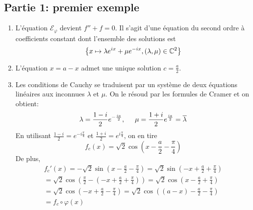 \subsection*{Partie 1: premier exemple}
\begin{enumerate}
  \item L'équation $\mathcal{E}_\varphi$ devient $f''+f=0$. Il s'agit d'une équation du second ordre à coefficients constant dont l'ensemble des solutions est
\begin{displaymath}
  \left\lbrace 
x\mapsto \lambda e^{ix} + \mu e^{-ix}, (\lambda,\mu)\in \mathbb{C}^2  
  \right\rbrace 
\end{displaymath}
\item L'équation $x = a-x$ admet une unique solution $c=\frac{a}{2}$.
\item Les conditions de Cauchy se traduisent par un système de deux équations linéaires aux inconnues $\lambda$ et $\mu$. On le résoud par les formules de Cramer et on obtient:
\begin{displaymath}
  \lambda = \frac{1-i}{2}e^{-\frac{ia}{2}}, \hspace{0.5cm}\mu = \frac{1+i}{2}e^{\frac{ia}{2}} = \overline{\lambda}
\end{displaymath}
En utilisant $\frac{1-i}{2}=e^{-i\frac{\pi}{4}}$ et $\frac{1+i}{2}=e^{i\frac{\pi}{4}}$, on en tire
\begin{displaymath}
  f_c(x) = \sqrt{2}\cos\left( x-\frac{a}{2}-\frac{\pi}{4}\right) 
\end{displaymath}
De plus,
\begin{multline*}
  f_c'(x) = -\sqrt{2}\sin\left( x-\frac{a}{2}-\frac{\pi}{4}\right)
=\sqrt{2}\sin\left( -x+\frac{a}{2}+\frac{\pi}{4}\right)\\
= \sqrt{2}\cos\left(\frac{\pi}{2}-\left( -x+\frac{a}{2}+\frac{\pi}{4}\right)  \right) 
=\sqrt{2}\cos\left(x- \frac{a}{2} + \frac{\pi}{4}\right) \\
=\sqrt{2}\cos\left(-x+ \frac{a}{2} - \frac{\pi}{4}\right) 
=\sqrt{2}\cos\left((a-x)- \frac{a}{2} - \frac{\pi}{4}\right)\\
=f_c\circ \varphi(x)
\end{multline*}

\end{enumerate}
